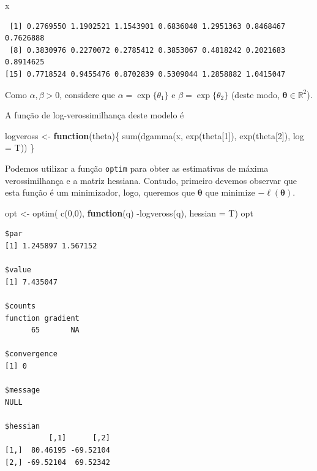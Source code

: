 \documentclass[
  letterpaper,
  DIV=11,
  numbers=noendperiod]{scrreprt}
\newenvironment{Shaded}{\begin{snugshade}}{\end{snugshade}}
\newcommand{\AttributeTok}[1]{\textcolor[rgb]{0.40,0.45,0.13}{#1}}
\newcommand{\ControlFlowTok}[1]{\textcolor[rgb]{0.00,0.23,0.31}{\textbf{#1}}}
\newcommand{\DecValTok}[1]{\textcolor[rgb]{0.68,0.00,0.00}{#1}}
\newcommand{\FunctionTok}[1]{\textcolor[rgb]{0.28,0.35,0.67}{#1}}
\newcommand{\NormalTok}[1]{\textcolor[rgb]{0.00,0.23,0.31}{#1}}
\newcommand{\OtherTok}[1]{\textcolor[rgb]{0.00,0.23,0.31}{#1}}
\newcommand{\SpecialCharTok}[1]{\textcolor[rgb]{0.37,0.37,0.37}{#1}}
\theoremstyle{plain}
\theoremstyle{definition}
\theoremstyle{definition}
\theoremstyle{remark}
\begin{document}
\begin{Shaded}
\begin{Highlighting}[]
\NormalTok{x}
\end{Highlighting}
\end{Shaded}

\begin{verbatim}
 [1] 0.2769550 1.1902521 1.1543901 0.6836040 1.2951363 0.8468467 0.7626888
 [8] 0.3830976 0.2270072 0.2785412 0.3853067 0.4818242 0.2021683 0.8914625
[15] 0.7718524 0.9455476 0.8702839 0.5309044 1.2858882 1.0415047
\end{verbatim}

Como \(\alpha,\beta>0\), considere que \(\alpha=\exp\{\theta_1\}\) e
\(\beta=\exp\{\theta_2\}\) (deste modo,
\(\boldsymbol{\theta}\in\mathbb{R}^2\)).

A função de log-verossimilhança deste modelo é

\begin{Shaded}
\begin{Highlighting}[]
\NormalTok{logveross }\OtherTok{\textless{}{-}} \ControlFlowTok{function}\NormalTok{(theta)\{ }\FunctionTok{sum}\NormalTok{(}\FunctionTok{dgamma}\NormalTok{(x, }\FunctionTok{exp}\NormalTok{(theta[}\DecValTok{1}\NormalTok{]), }\FunctionTok{exp}\NormalTok{(theta[}\DecValTok{2}\NormalTok{]), }\AttributeTok{log =}\NormalTok{ T))}
\NormalTok{\}}
\end{Highlighting}
\end{Shaded}

Podemos utilizar a função \texttt{optim} para obter as estimativas de
máxima verossimilhança e a matriz hessiana. Contudo, primeiro devemos
observar que esta função é um minimizador, logo, queremos que
\(\boldsymbol{\theta}\) que minimize \(-\ell({\boldsymbol{\theta}})\).

\begin{Shaded}
\begin{Highlighting}[]
\NormalTok{opt }\OtherTok{\textless{}{-}} \FunctionTok{optim}\NormalTok{( }\FunctionTok{c}\NormalTok{(}\DecValTok{0}\NormalTok{,}\DecValTok{0}\NormalTok{), }\ControlFlowTok{function}\NormalTok{(q) }\SpecialCharTok{{-}}\FunctionTok{logveross}\NormalTok{(q), }\AttributeTok{hessian =}\NormalTok{ T)}
\NormalTok{opt}
\end{Highlighting}
\end{Shaded}

\begin{verbatim}
$par
[1] 1.245897 1.567152

$value
[1] 7.435047

$counts
function gradient 
      65       NA 

$convergence
[1] 0

$message
NULL

$hessian
          [,1]      [,2]
[1,]  80.46195 -69.52104
[2,] -69.52104  69.52342
\end{verbatim}
\end{document}
